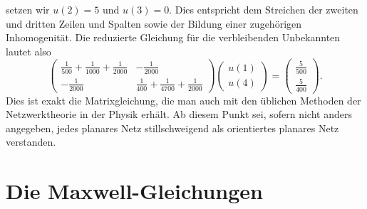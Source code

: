 \documentclass[11pt,a4paper,leqno]{report}
\numberwithin{equation}{chapter}
\begin{document}
setzen wir $u(2)=5$ und $u(3)=0$. 
Dies entspricht dem Streichen der zweiten und dritten Zeilen und Spalten 
sowie der Bildung einer zugehörigen Inhomogenität. 
Die reduzierte Gleichung für die verbleibenden Unbekannten lautet also
\[
\begin{pmatrix}
	\frac{1}{500}+\frac{1}{1000}+\frac{1}{2000} & -\tfrac{1}{2000}\\[6pt]
	-\tfrac{1}{2000} & \tfrac{1}{400}+\tfrac{1}{4700}+\tfrac{1}{2000}
\end{pmatrix}
\begin{pmatrix}
	u(1)\\
	u(4)
\end{pmatrix}
=
\begin{pmatrix}
	\tfrac{5}{500}\\[4pt]
	\tfrac{5}{400}
\end{pmatrix}.
\]
Dies ist exakt die Matrixgleichung, die man auch 
mit den üblichen Methoden der Netzwerktheorie in der Physik erhält.
Ab diesem Punkt sei, sofern nicht anders angegeben, jedes planares Netz stillschweigend als orientiertes planares Netz verstanden.

\chapter{Die Maxwell-Gleichungen}
\end{document}
